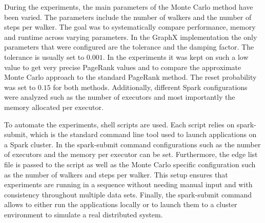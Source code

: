   

\par
During the experiments, the main parameters of the Monte Carlo method have been varied. The parameters include the number of walkers and the number of steps per walker. The goal was to systematically compare performance, memory and runtime across varying parameters. In the GraphX implementation the only parameters that were configured are the tolerance and the damping factor. The tolerance is usually set to $0.001$. In the experiments it was kept on such a low value to get very precise PageRank values and to compare the approximate Monte Carlo approach to the standard PageRank method. The reset probability was set to $0.15$ for both methods. Additionally, different Spark configurations were analyzed such as the number of executors and most importantly the memory allocated per executor. \par



To automate the experiments, shell scripts are used. Each script relies on spark-submit, which is the standard command line tool used to launch applications on a Spark cluster. In the spark-submit command configurations such as the number of executors and the memory per executor can be set. Furthermore, the edge list file is passed to the script as well as the Monte Carlo specific configuration such as the number of walkers and steps per walker. This setup ensures that experiments are running in a sequence without needing manual input and with consistency throughout multiple data sets. Finally, the spark-submit command allows to either run the applications locally or to launch them to a cluster environment to simulate a real distributed system. \par

